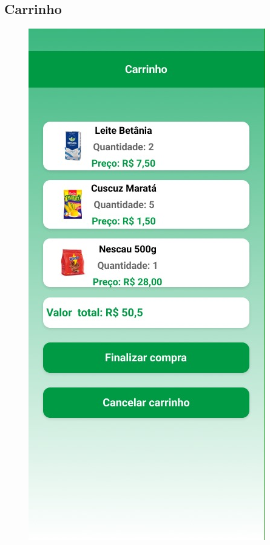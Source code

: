 \documentclass[12pt,oneside,a4paper,article]{abntex2}
\begin{document}
     \subsection{Carrinho}
  \begin{figure}[H]
        \centering
        \includegraphics[width=0.5\linewidth]{imagens-template//telas/carrinho.jpg}
        \label{fig:placeholder}
    \end{figure}
    
\end{document}

